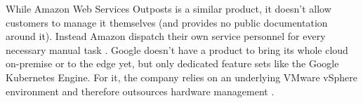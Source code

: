 \newline
While Amazon Web Services Outposts is a similar product, it doesn't allow customers to manage it themselves (and provides no public documentation around it). Instead Amazon dispatch their own service personnel for every necessary manual task \cite{aws_outposts} \cite{aws_outposts_faq}.
\newline
Google doesn't have a product to bring its whole cloud on-premise or to the edge yet, but only dedicated feature sets like the Google Kubernetes Engine. For it, the company relies on an underlying VMware vSphere environment and therefore outsources hardware management \cite{google_anthos_onprem}.


